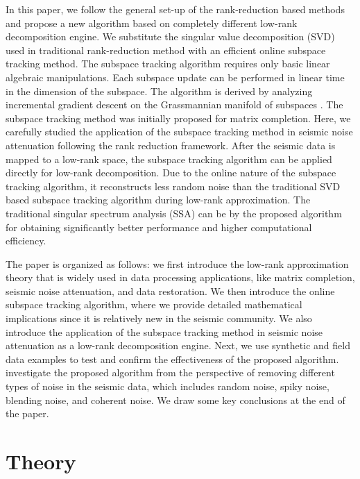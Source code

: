 In this paper, we follow the general set-up of the rank-reduction based methods and propose a new algorithm based on completely different low-rank decomposition engine. We substitute the singular value decomposition (SVD) used in traditional rank-reduction method with an efficient online subspace tracking method. The subspace tracking algorithm requires only basic linear algebraic manipulations. Each subspace update can be performed in linear time in the dimension of the subspace. The algorithm is derived by analyzing incremental gradient descent on the Grassmannian manifold of subspaces \cite[]{laura2010}. The subspace tracking method was initially proposed for matrix completion. Here, we carefully studied the application of the subspace tracking method in seismic noise attenuation following the rank reduction framework. After the seismic data is mapped to a low-rank space, the subspace tracking algorithm can be applied directly for low-rank decomposition. Due to the online nature of the subspace tracking algorithm, it reconstructs less random noise than the traditional SVD based subspace tracking algorithm during low-rank approximation.  The traditional singular spectrum analysis (SSA) can be  by the proposed algorithm for obtaining significantly better performance and higher computational efficiency. 

The paper is organized as follows: we first introduce the low-rank approximation theory that is widely used in data processing applications, like matrix completion, seismic noise attenuation, and data restoration. We then introduce the online subspace tracking algorithm, where we provide detailed mathematical implications since it is relatively new in the seismic community. We also introduce the application of the subspace tracking method in seismic noise attenuation as a low-rank decomposition engine.  Next, we use synthetic and field data examples to test and confirm the effectiveness of the proposed algorithm.  investigate the proposed algorithm from the perspective of removing different types of noise in the seismic data, which includes random noise, spiky noise, blending noise, and coherent noise. We draw some key conclusions at the end of the paper.

\section{Theory}
